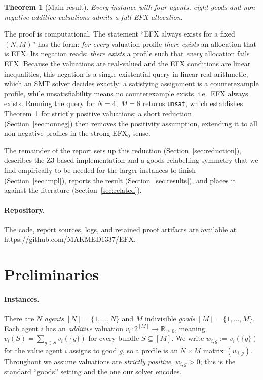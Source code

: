 \documentclass[11pt,a4paper]{article}
\theoremstyle{definition}
\theoremstyle{plain}
\newtheorem{theorem}{Theorem}
\newcommand{\EFX}{\textsf{EFX}}
\newcommand{\agents}{N}
\newcommand{\goods}{M}
\newcommand{\val}[1]{v_{#1}}
\begin{document}
\begin{theorem}[Main result]
\label{thm:main}
Every instance with four agents, eight goods and non-negative additive
valuations admits a full \EFX{} allocation.
\end{theorem}

The proof is computational. The statement ``\EFX{} always exists for a fixed
$(\agents,\goods)$'' has the form: \emph{for every} valuation profile \emph{there
exists} an allocation that is \EFX. Its negation reads: \emph{there exists} a
profile such that \emph{every} allocation fails \EFX. Because the valuations are
real-valued and the \EFX{} conditions are linear inequalities, this negation is a
single existential query in linear real arithmetic, which an SMT solver decides
exactly: a satisfying assignment is a counterexample profile, while
unsatisfiability means no counterexample exists, i.e.\ \EFX{} always exists.
Running the query for $\agents=4,\ \goods=8$ returns \texttt{unsat}, which
establishes Theorem~\ref{thm:main} for strictly positive valuations; a short
reduction (Section~\ref{sec:nonneg}) then removes the positivity assumption,
extending it to all non-negative profiles in the strong \EFX$_0$ sense.

The remainder of the report sets up this reduction
(Section~\ref{sec:reduction}), describes the Z3-based implementation and a
goods-relabelling symmetry that we find empirically to be needed for the larger
instances to finish (Section~\ref{sec:impl}), reports the result
(Section~\ref{sec:results}), and places it against the literature
(Section~\ref{sec:related}).

\paragraph{Repository.}
The code, report sources, logs, and retained proof artifacts are available at
\url{https://github.com/MAKMED1337/EFX}.

\section{Preliminaries}
\label{sec:prelim}

\paragraph{Instances.}
There are $\agents$ \emph{agents} $[\agents]=\{1,\dots,\agents\}$ and $\goods$
indivisible \emph{goods} $[\goods]=\{1,\dots,\goods\}$. Each agent $i$ has an
\emph{additive} valuation $\val{i}\colon 2^{[\goods]}\to\mathbb{R}_{\geq 0}$,
meaning $\val{i}(S)=\sum_{g\in S}\val{i}(\{g\})$ for every bundle
$S\subseteq[\goods]$. We write $w_{i,g}:=\val{i}(\{g\})$ for the value agent $i$
assigns to good $g$, so a profile is an $\agents\times\goods$ matrix
$(w_{i,g})$. Throughout we assume valuations are \emph{strictly positive},
$w_{i,g}>0$; this is the standard ``goods'' setting and the one our solver
encodes.
\end{document}
